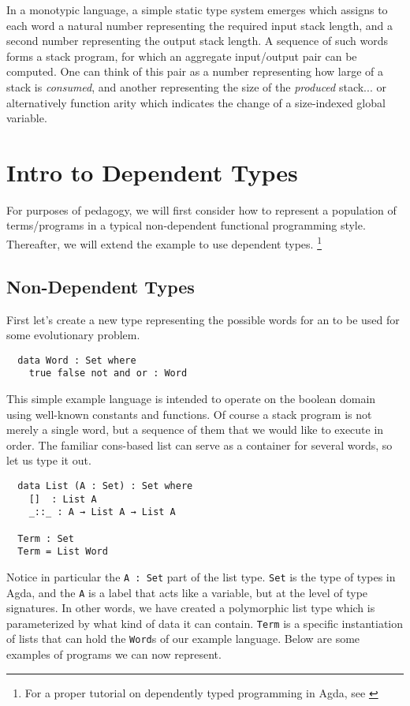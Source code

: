 \documentclass{acm_proc_article-sp}
\begin{document}
In a monotypic language, a simple static type system emerges which
assigns to each word a natural number representing the required input
stack length, and a second number representing the output stack
length. A sequence of such words forms a stack program, for which an
aggregate input/output pair can be computed. One can think of this
pair as a number representing how large of a stack is
\textit{consumed}, and another representing the size of the
\textit{produced} stack... or alternatively function arity which
indicates the change of a size-indexed global variable.

\section{Intro to Dependent Types}

For purposes of pedagogy, we will first consider how to represent a
population of terms/programs in a typical non-dependent functional
programming style. Thereafter, we will extend the example to use
dependent types.
\footnote{For a proper tutorial on dependently typed programming in Agda, see \cite{norell:agdatut}}

\subsection{Non-Dependent Types}

First let's create a new type representing the possible words for an
to be used for some evolutionary problem.

\begin{verbatim}
  data Word : Set where
    true false not and or : Word
\end{verbatim}

This simple example language is intended to operate on the boolean domain using
well-known constants and functions. Of course a stack program is not
merely a single word, but a sequence of them that we would like to
execute in order. The familiar cons-based list can serve as a
container for several words, so let us type it out.

\begin{verbatim}
  data List (A : Set) : Set where
    []  : List A
    _::_ : A → List A → List A

  Term : Set
  Term = List Word
\end{verbatim}

Notice in particular the \texttt{A : Set} part of the list
type. \texttt{Set} is the type of types in Agda, and the \texttt{A} is
a label that acts like a variable, but at the level of type
signatures. In other words, we have created a polymorphic list type
which is parameterized by what kind of data it can
contain. \texttt{Term} is a specific instantiation of lists that can
hold the \texttt{Word}s of our example language. Below are some
examples of programs we can now represent.
\end{document}
